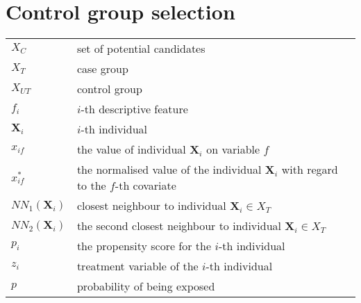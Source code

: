\thispagestyle{plain}

\section*{Control group selection}

\begin{tabular}{lp{10cm}}
	$X_C$                  & set of potential candidates                                                                                                       \\
	$X_T$                  & case group                                                                                                                        \\
	$X_{UT}$               & control group                                                                                                                     \\
	$f_i$                  & $i$-th descriptive feature                                                                                                              \\
	$\textbf{X}_i$         & $i$-th individual                                                                                                                          \\
        	$x_{if}$                       & the value of individual $\textbf{X}_i$ on variable $f$                                                       \\
         	$x^{*}_{if}$                   & the normalised value of the individual $\textbf{X}_i$ with regard to the $f$-th covariate                    \\
	$NN_1(\textbf{X}_i)$   & closest neighbour to individual $\textbf{X}_i \in X_T$                                                                            \\
	$NN_2(\textbf{X}_i)$   & the second closest neighbour to individual $\textbf{X}_i \in X_T$                                                                 \\
	$p_i$                  & the propensity score for the $i$-th individual                                                                                    \\
	$z_i$                  & treatment variable of the $i$-th individual                                                                                                                \\ 
	$p$                    & probability of being exposed                                                                                                      \\

\end{tabular}
